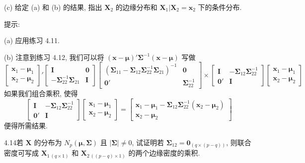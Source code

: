 (c) 给定 (a) 和 (b) 的结果, 指出 $\mathbf{X}_{2}$ 的边缘分布和 $\mathbf{X}_{1}|\mathbf{X}_{2}=\mathbf{x}_{2}$ 下的条件分布.

提示:

(a) 应用练习 4.11.

(b) 注意到练习 4.12, 我们可以将 $(\mathbf{x}-\boldsymbol{\mu})'\boldsymbol{\Sigma}^{-1}(\mathbf{x}-\boldsymbol{\mu})$ 写做
\[
\begin{bmatrix}\mathbf{x}_{1}-\boldsymbol{\mu}_{1}\\[4pt]\mathbf{x}_{2}-\boldsymbol{\mu}_{2}\end{bmatrix}'
\begin{bmatrix}\mathbf{I}&\mathbf{0}\\[4pt]-\boldsymbol{\Sigma}_{22}^{-1}\boldsymbol{\Sigma}_{21}&\mathbf{I}\end{bmatrix}
\begin{bmatrix}(\boldsymbol{\Sigma}_{11}-\boldsymbol{\Sigma}_{12}\boldsymbol{\Sigma}_{22}^{-1}\boldsymbol{\Sigma}_{21})^{-1}&\mathbf{0}\\[4pt]\mathbf{0}'&\boldsymbol{\Sigma}_{22}^{-1}\end{bmatrix}
\times\begin{bmatrix}\mathbf{I}&-\boldsymbol{\Sigma}_{12}\boldsymbol{\Sigma}_{22}^{-1}\\[4pt]\mathbf{0}'&\mathbf{I}\end{bmatrix}
\begin{bmatrix}\mathbf{x}_{1}-\boldsymbol{\mu}_{1}\\[4pt]\mathbf{x}_{2}-\boldsymbol{\mu}_{2}\end{bmatrix}
\]
如果我们组合乘积, 使得
\[
\begin{bmatrix}\mathbf{I}&-\boldsymbol{\Sigma}_{12}\boldsymbol{\Sigma}_{22}^{-1}\\[4pt]\mathbf{0}'&\mathbf{I}\end{bmatrix}
\begin{bmatrix}\mathbf{x}_{1}-\boldsymbol{\mu}_{1}\\[4pt]\mathbf{x}_{2}-\boldsymbol{\mu}_{2}\end{bmatrix}
=\begin{bmatrix}\mathbf{x}_{1}-\boldsymbol{\mu}_{1}-\boldsymbol{\Sigma}_{12}\boldsymbol{\Sigma}_{22}^{-1}(\mathbf{x}_{2}-\boldsymbol{\mu}_{2})\\[4pt]\mathbf{x}_{2}-\boldsymbol{\mu}_{2}\end{bmatrix}
\]
便得所需结果.

4.14\quad 若 $\mathbf{X}$ 的分布为 $N_{p}(\boldsymbol{\mu},\boldsymbol{\Sigma})$ 且 $|\boldsymbol{\Sigma}|\ne 0$, 试证明若 $\boldsymbol{\Sigma}_{12}=\mathbf{0}_{(q\times(p-q))}$, 则联合密度可写成 $\mathbf{X}_{1\,(q\times 1)}$ 和 $\mathbf{X}_{2\,((p-q)\times 1)}$ 的两个边缘密度的乘积.

